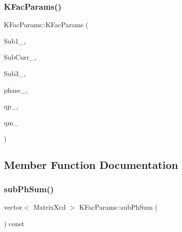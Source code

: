 \subsubsection{\texorpdfstring{KFacParams()}{KFacParams()}}
{\footnotesize\ttfamily K\+Fac\+Params\+::\+K\+Fac\+Params (\begin{DoxyParamCaption}\item[{map$<$ int, Eigen\+::\+Matrix\+Xcd $>$}]{Sub1\+\_\+,  }\item[{map$<$ int, Eigen\+::\+Matrix\+Xcd $>$}]{Sub\+Curr\+\_\+,  }\item[{map$<$ int, Eigen\+::\+Matrix\+Xcd $>$}]{Sub3\+\_\+,  }\item[{\mbox{\hyperlink{structPh_1_1phChars}{Ph\+::ph\+Chars}}}]{phase\+\_\+,  }\item[{Vector\+Xd}]{qp\+\_\+,  }\item[{Vector\+Xd}]{qm\+\_\+ }\end{DoxyParamCaption})}



\subsection{Member Function Documentation}
\mbox{\label{classKFacParams_ac52a334fdecfea49db82683e194580a1}} 
\subsubsection{\texorpdfstring{subPhSum()}{subPhSum()}}
{\footnotesize\ttfamily vector$<$ Matrix\+Xcd $>$ K\+Fac\+Params\+::sub\+Ph\+Sum (\begin{DoxyParamCaption}{ }\end{DoxyParamCaption}) const\hspace{0.3cm}{\ttfamily [virtual]}}

